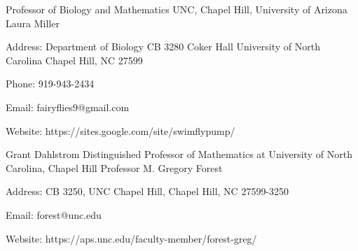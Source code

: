 
  \cventry
    {Professor of Biology and Mathematics UNC, Chapel Hill, University of Arizona} %
    {Laura Miller} %
    {} %
    {} %
    {
      \begin{cvitems} %
        \item {Address: Department of Biology CB 3280 Coker Hall University of North Carolina Chapel Hill, NC 27599}
        \item {Phone: 919-943-2434}
        \item {Email: fairyflies9@gmail.com }
        \item {Website: https://sites.google.com/site/swimflypump/}
      \end{cvitems}
    }

\cventry
    {Grant Dahlstrom Distinguished Professor of Mathematics at University of North Carolina, Chapel Hill} %
    {Professor M. Gregory Forest} %
    {} %
    {} %
    {
      \begin{cvitems} %
        \item {Address: CB 3250, UNC Chapel Hill, Chapel Hill, NC 27599-3250}
        \item {Email: forest@unc.edu }
        \item {Website: https://aps.unc.edu/faculty-member/forest-greg/}
      \end{cvitems}
    }
